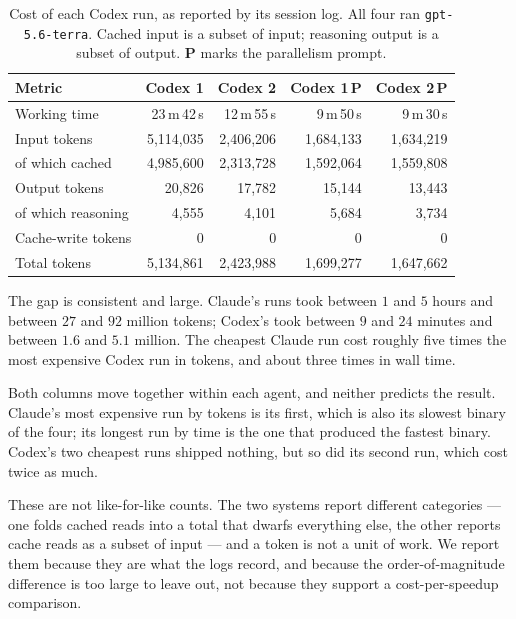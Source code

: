 \begin{table}[H]
\centering
\caption{Cost of each Codex run, as reported by its session log. All four ran
\texttt{gpt-5.6-terra}. Cached input is a subset of input; reasoning output is a
subset of output. \textbf{P} marks the parallelism prompt.}
\label{tab:cost-codex}
\small
\begin{tabular}{lrrrr}
\toprule
\textbf{Metric} & \textbf{Codex 1} & \textbf{Codex 2} & \textbf{Codex 1\,P} & \textbf{Codex 2\,P} \\
\midrule
Working time              & 23\,m\,42\,s & 12\,m\,55\,s & 9\,m\,50\,s & 9\,m\,30\,s \\
\midrule
Input tokens              & 5,114,035 & 2,406,206 & 1,684,133 & 1,634,219 \\
\quad of which cached     & 4,985,600 & 2,313,728 & 1,592,064 & 1,559,808 \\
Output tokens             & 20,826    & 17,782    & 15,144    & 13,443 \\
\quad of which reasoning  & 4,555     & 4,101     & 5,684     & 3,734 \\
Cache-write tokens        & 0         & 0         & 0         & 0 \\
\midrule
Total tokens              & 5,134,861 & 2,423,988 & 1,699,277 & 1,647,662 \\
\bottomrule
\end{tabular}
\end{table}

The gap is consistent and large. Claude's runs took between $1$ and $5$ hours
and between $27$ and $92$ million tokens; Codex's took between $9$ and $24$
minutes and between $1.6$ and $5.1$ million. The cheapest Claude run cost
roughly five times the most expensive Codex run in tokens, and about three times in
wall time.

Both columns move together within each agent, and neither predicts the result.
Claude's most expensive run by tokens is its first, which is also its slowest
binary of the four; its longest run by time is the one that produced the fastest
binary. Codex's two cheapest runs shipped nothing, but so did its second run,
which cost twice as much.

These are not like-for-like counts. The two systems report different categories
--- one folds cached reads into a total that dwarfs everything else, the other
reports cache reads as a subset of input --- and a token is not a unit of work.
We report them because they are what the logs record, and because the
order-of-magnitude difference is too large to leave out, not because they
support a cost-per-speedup comparison.

